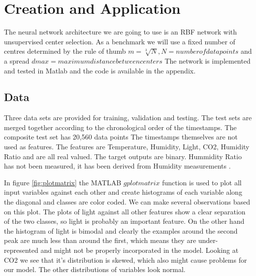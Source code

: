 \documentclass[a4paper, 11pt]{article}
\begin{document}
\section*{Creation and Application}
The neural network architecture we are going to use is an RBF network with unsupervised center selection. As a benchmark we will use a fixed number of centres determined by the rule of thumb $m = \sqrt[3]{N}, N = number of data points$ and a spread $dmax = maximum distance between centers$ The network is implemented and tested in Matlab and the code is available in the appendix. 

\subsection*{Data}
Three data sets are provided for training, validation and testing. The test sets are merged together according to the chronological order of the timestamps. The composite test set has 20,560 data points The timestamps themselves are not used as features. The features are Temperature, Humidity, Light, CO2, Humidity Ratio and are all real valued. The target outputs are binary. Hummidity Ratio has not been measured, it has been derived from Humidity measurements \cite{Candanedo2016}. 

In figure \ref{fig:plotmatrix} the MATLAB $gplotmatrix$ function is used to plot all input variables against each other and create histograms of each variable along the diagonal and classes are color coded. We can make several observations based on this plot. The plots of light against all other features show a clear separation of the two classes, so light is probably an important feature. On the other hand the histogram of light is bimodal and clearly the examples around the second peak are much less than around the first, which means they are under-represented and might not be properly incorporated in the model. Looking at CO2 we see that it's distribution is skewed, which also might cause problems for our model. The other distributions of variables look normal. 
\end{document}
